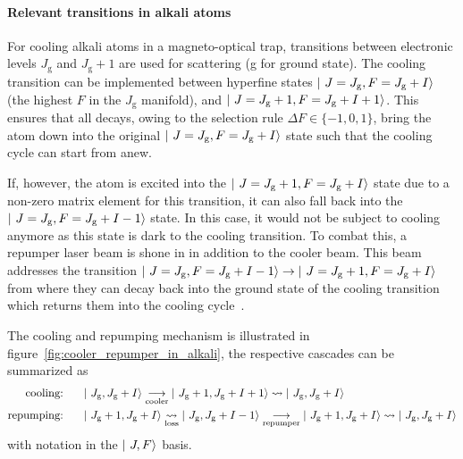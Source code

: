 \paragraph{Relevant transitions in alkali atoms}
\sloppy For cooling alkali atoms in a magneto-optical trap, transitions between electronic levels $J_\text{g}$ and $J_\text{g} + 1$ are used for scattering (g for ground state). The cooling transition can be imple\-mented between hyperfine states $\Ket{~J = J_\text{g}, F = J_\text{g} + I}$ (the highest $F$ in the $J_\text{g}$ manifold), and $\Ket{~J = J_\text{g} + 1, F= J_\text{g} + I + 1}$. This ensures that all decays, owing to the selection rule $\Delta F \in \{-1, 0, 1\}$,  bring the atom down into the original $\Ket{~J = J_\text{g}, F = J_\text{g} + I}$ state such that the cooling cycle can start from anew.

If, however, the atom is excited into the $\Ket{~J = J_\text{g} + 1, F = J_\text{g} + I}$ state due to a non-zero matrix element for this transition, it can also fall back into the $\Ket{~J = J_\text{g}, F = J_\text{g} + I - 1}$ state. In this case, it would not be subject to cooling anymore as this state is dark to the cooling transition. To combat this, a repumper laser beam is shone in in addition to the cooler beam. This beam addresses the transition $\Ket{~J = J_\text{g}, F = J_\text{g} + I - 1} \rightarrow \Ket{~J = J_\text{g} + 1, F = J_\text{g} + I}$ from where they can decay back into the ground state of the cooling transition which returns them into the cooling cycle~\cite{metcalf_laser_1999}.

The cooling and repumping mechanism is illustrated in figure~\ref{fig:cooler_repumper_in_alkali}, the respective cascades can be summarized as
\begin{align}
    \label{eq:cooler_cascade}\text{cooling:}~~~~~ & \Ket{~J_\text{g},J_\text{g} + I} \underset{\text{cooler}}{\longrightarrow} \Ket{~J_\text{g} + 1, J_\text{g} + I + 1} \rightsquigarrow  \Ket{~J_\text{g}, J_\text{g} + I}\\
    \label{eq:repumper_cascade}\text{repumping:}~~~~~ & \Ket{~J_\text{g} + 1, J_\text{g} + I} \underset{\text{loss}}{\rightsquigarrow} \Ket{~J_\text{g}, J_\text{g} + I - 1}  \underset{\text{repumper}}{\longrightarrow} \Ket{~J_\text{g} + 1, J_\text{g} + I} \rightsquigarrow  \Ket{~J_\text{g}, J_\text{g} + I}
\end{align}
with notation in the $\Ket{~J, F}$ basis.

